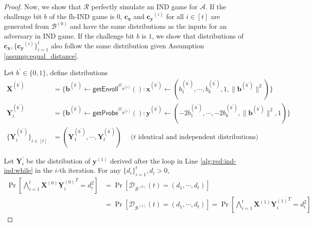 \begin{proof}
Now, we show that $\mathcal{R}$ perfectly simulate an \textsf{IND} game for $\mathcal{A}$. If the challenge bit $b$ of the \textsf{fh-IND} game is $0$, $\mathbf{c_x}$ and $\mathbf{c_y}^{(i)}$ for all $i \in [t]$ are generated from $\mathcal{B}^{(0)}$ and have the same distributions as the inputs for an adversary in \textsf{IND} game.
If the challenge bit $b$ is $1$, we show that distributions of $\mathbf{c_x}, \{ \mathbf{c_y}^{(i)} \}_{i=1}^t$ also follow the same distribution given Assumption \ref{assump:equal_distance}.

Let $b^\prime \in \{0, 1\}$, define distributions 
\begin{align*}
	\mathbf{X}^{(b^\prime)} &= \{ \mathbf{b}^{(b^\prime)} \gets \textsf{getEnroll}^{\mathcal{O}_{\mathcal{B}^{(b^\prime)}}}() : \mathbf{x}^{(b^{\prime})} \gets (b_1^{(b^{\prime})}, \cdots, b_k^{(b^{\prime})}, 1, \|\mathbf{b}^{ (b^{\prime}) }\|^2) \} \\
	\mathbf{Y}^{ (b^\prime) }_i &= \{ \mathbf{b}^{(b^\prime)} \gets \textsf{getProbe}^{\mathcal{O}_{\mathcal{B}^{(b^\prime)}}}() : \mathbf{y}^{(b^{\prime})} \gets ( -2b_1^{(b^{\prime})}, \cdots, -2b_k^{(b^{\prime})}, \|\mathbf{b}^{ (b^{\prime}) }\|^2, 1) \} \\
	\{ \mathbf{Y}^{ (b^\prime) }_i \}_{ i \in [t] } &= (\mathbf{Y}^{ (b^\prime) }_1, \cdots, \mathbf{Y}^{ (b^\prime) }_t) \quad  \text{ ($t$ identical and independent distributions) }
\end{align*}

Let $\mathbf{Y}^\prime_i$ be the distribution of $\mathbf{y}^{(1)}$ derived after the loop in Line \ref{alg:red:ind-ind:while} in the $i$-th iteration.
For any $\{ d_i \}_{i=1}^t, d_i > 0$,
\begin{align*}
\Pr \left[ \bigwedge_{i=1}^t \mathbf{X}^{(0)} {\mathbf{Y}^{(0)}_i}^T = d_i^2 \right] 
&= \Pr \left[ \mathcal{D}_{\mathcal{B}^{(0)}}(t) = (d_1, \cdots, d_t) \right] \\
&= \Pr \left[ \mathcal{D}_{\mathcal{B}^{(1)}}(t) = (d_1, \cdots, d_t) \right] = \Pr \left[ \bigwedge_{i=1}^t \mathbf{X}^{(1)} {\mathbf{Y}^{(1)}_i}^T = d_i^2 \right]
\end{align*}


\end{proof}
